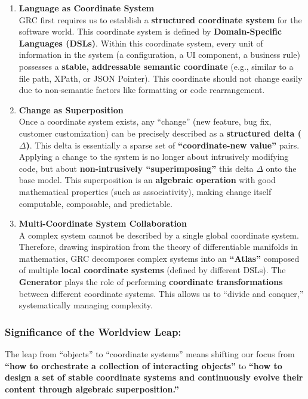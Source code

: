 \documentclass[11pt]{article}
\begin{document}
\begin{enumerate}
    \item \textbf{Language as Coordinate System} \\
    GRC first requires us to establish a \textbf{structured coordinate system} for the software world. This coordinate system is defined by \textbf{Domain-Specific Languages (DSLs)}. Within this coordinate system, every unit of information in the system (a configuration, a UI component, a business rule) possesses a \textbf{stable, addressable semantic coordinate} (e.g., similar to a file path, XPath, or JSON Pointer). This coordinate should not change easily due to non-semantic factors like formatting or code rearrangement.

    \item \textbf{Change as Superposition} \\
    Once a coordinate system exists, any ``change'' (new feature, bug fix, customer customization) can be precisely described as a \textbf{structured delta ($\Delta$)}. This delta is essentially a sparse set of \textbf{``coordinate-new value''} pairs. Applying a change to the system is no longer about intrusively modifying code, but about \textbf{non-intrusively ``superimposing''} this delta $\Delta$ onto the base model. This superposition is an \textbf{algebraic operation} with good mathematical properties (such as associativity), making change itself computable, composable, and predictable.

    \item \textbf{Multi-Coordinate System Collaboration} \\
    A complex system cannot be described by a single global coordinate system. Therefore, drawing inspiration from the theory of differentiable manifolds in mathematics, GRC decomposes complex systems into an \textbf{``Atlas''} composed of multiple \textbf{local coordinate systems} (defined by different DSLs). The \textbf{Generator} plays the role of performing \textbf{coordinate transformations} between different coordinate systems. This allows us to ``divide and conquer,'' systematically managing complexity.
\end{enumerate}

\subsubsection*{Significance of the Worldview Leap:}

The leap from ``objects'' to ``coordinate systems'' means shifting our focus from \textbf{``how to orchestrate a collection of interacting objects''} to \textbf{``how to design a set of stable coordinate systems and continuously evolve their content through algebraic superposition.''}
\end{document}
